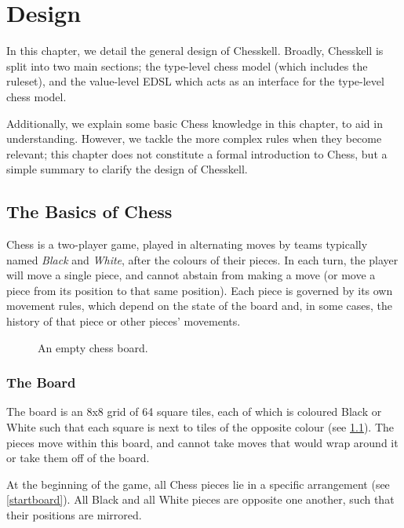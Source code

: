 \chapter{Design}

In this chapter, we detail the general design of Chesskell. Broadly, Chesskell is split into two main sections; the type-level chess model (which includes the ruleset), and the value-level EDSL which acts as an interface for the type-level chess model.

Additionally, we explain some basic Chess knowledge in this chapter, to aid in understanding. However, we tackle the more complex rules when they become relevant; this chapter does not constitute a formal introduction to Chess, but a simple summary to clarify the design of Chesskell.

\section{The Basics of Chess}

Chess is a two-player game, played in alternating moves by teams typically named \emph{Black} and \emph{White}, after the colours of their pieces. In each turn, the player will move a single piece, and cannot abstain from making a move (or move a piece from its position to that same position). Each piece is governed by its own movement rules, which depend on the state of the board and, in some cases, the history of that piece or other pieces' movements.

\begin{figure}[h]
    \centering
    \showboard
    \caption{An empty chess board.}
    \label{chessboard}
\end{figure}

\subsection{The Board}

The board is an 8x8 grid of 64 square tiles, each of which is coloured Black or White such that each square is next to tiles of the opposite colour (see \cref{chessboard}). The pieces move within this board, and cannot take moves that would wrap around it or take them off of the board.

At the beginning of the game, all Chess pieces lie in a specific arrangement (see \cref{startboard}). All Black and all White pieces are opposite one another, such that their positions are mirrored.

